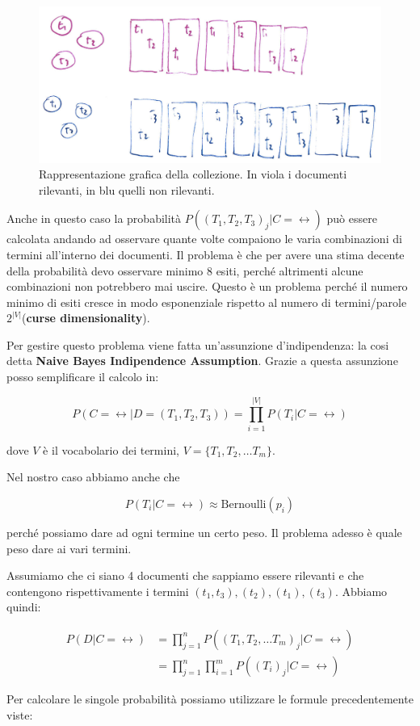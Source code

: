 \begin{figure}[htbp]
	\centering
	\includegraphics[width=.5\textwidth]{images/l10-fig-2}
	\caption{Rappresentazione grafica della collezione. In viola i documenti rilevanti, in blu quelli non rilevanti.}
\end{figure}

Anche in questo caso la probabilità $P((T_1, T_2,T_3)_j | C = \rel)$ può essere calcolata andando ad osservare quante volte compaiono le varia combinazioni di termini all'interno dei documenti.
Il problema è che per avere una stima decente della probabilità devo osservare minimo 8 esiti, perché altrimenti alcune combinazioni non potrebbero mai uscire.
Questo è un problema perché il numero minimo di esiti cresce in modo esponenziale rispetto al numero di termini/parole $2^{|V|}$(\textbf{curse dimensionality}).

Per gestire questo problema viene fatta un'assunzione d'indipendenza: la cosi detta \textbf{Naive Bayes Indipendence Assumption}.
Grazie a questa assunzione posso semplificare il calcolo in:

$$
P(C = \rel | D=(T_1, T_2, T_3)) = \prod\limits_{i = 1}^{|V|}P(T_i|C=\rel)
$$

\noindent dove $V$ è il vocabolario dei termini, $V = \{ T_1, T_2, \ldots T_m\}$.

Nel nostro caso abbiamo anche che

$$
P(T_i|C=\rel) \approx \text{Bernoulli}(p_i)
$$

\noindent perché possiamo dare ad ogni termine un certo peso.
Il problema adesso è quale peso dare ai vari termini.

Assumiamo che ci siano 4 documenti che sappiamo essere rilevanti e che contengono rispettivamente i termini $(t_1, t_3), (t_2), (t_1), (t_3)$. Abbiamo quindi:

\begin{align*}
P(D | C=\rel) &= \prod\limits_{j=1}^n P((T_{1},T_{2},\ldots T_{m})_j|C=\rel) \\
&= \prod\limits_{j=1}^n \prod\limits_{i=1}^m P((T_i)_j | C=\rel)
\end{align*}


\noindent Per calcolare le singole probabilità possiamo utilizzare le formule precedentemente viste:

